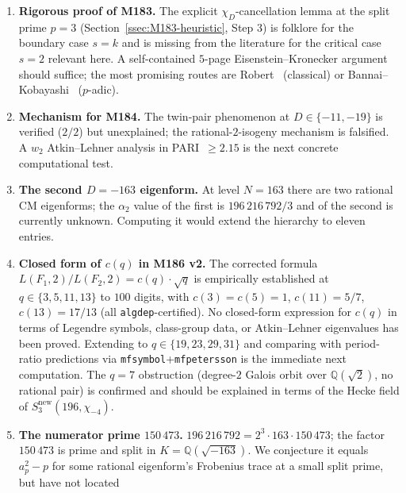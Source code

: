 \documentclass[12pt]{amsart}
\theoremstyle{definition}
\newcommand{\Q}{\mathbb{Q}}
\begin{document}
\begin{enumerate}[leftmargin=2em,label=\textbf{OP\arabic*.}]
  \item \textbf{Rigorous proof of M183.} The explicit
        $\chi_D$-cancellation lemma at the split prime $p = 3$
        (Section~\ref{ssec:M183-heuristic}, Step 3) is folklore for
        the boundary case $s = k$ and is missing from the literature
        for the critical case $s = 2$ relevant here. A self-contained
        $5$-page Eisenstein--Kronecker argument should suffice; the
        most promising routes are
        Robert~\cite{CITE-NEEDED-Robert1973} (classical) or
        Bannai--Kobayashi~\cite{CITE-NEEDED-BannaiKobayashi2011}
        ($p$-adic).
  \item \textbf{Mechanism for M184.} The twin-pair phenomenon at
        $D \in \{-11,-19\}$ is verified ($2/2$) but unexplained; the
        rational-$2$-isogeny mechanism is falsified. A $w_2$
        Atkin--Lehner analysis in PARI~$\geq 2.15$ is the next
        concrete computational test.
  \item \label{op:163-second}\textbf{The second $D = -163$ eigenform.}
        At level $N = 163$ there are two rational CM eigenforms; the
        $\alpha_2$ value of the first is $196\,216\,792/3$ and of the
        second is currently unknown. Computing it would extend the
        hierarchy to eleven entries.
  \item \textbf{Closed form of $c(q)$ in M186 v2.}  The corrected formula
        $L(F_1,2)/L(F_2,2)=c(q)\cdot\sqrt{q}$ is empirically established
        at $q\in\{3,5,11,13\}$ to $100$ digits, with $c(3)=c(5)=1$,
        $c(11)=5/7$, $c(13)=17/13$ (all \texttt{algdep}-certified).
        No closed-form expression for $c(q)$ in terms of Legendre symbols,
        class-group data, or Atkin--Lehner eigenvalues has been proved.
        Extending to $q\in\{19,23,29,31\}$ and comparing with
        period-ratio predictions via \texttt{mfsymbol}+\texttt{mfpetersson}
        is the immediate next computation.  The $q=7$ obstruction
        (degree-$2$ Galois orbit over $\Q(\sqrt{2})$, no rational pair)
        is confirmed and should be explained in terms of the Hecke field
        of $S_3^{\mathrm{new}}(196,\chi_{-4})$.
  \item \label{op:150473}\textbf{The numerator prime $150\,473$.}
        $196\,216\,792 = 2^3 \cdot 163 \cdot 150\,473$; the factor
        $150\,473$ is prime and split in $K = \Q(\sqrt{-163})$. We
        conjecture it equals $a_p^2 - p$ for some rational eigenform's
        Frobenius trace at a small split prime, but have not located

\end{enumerate}
\end{document}
